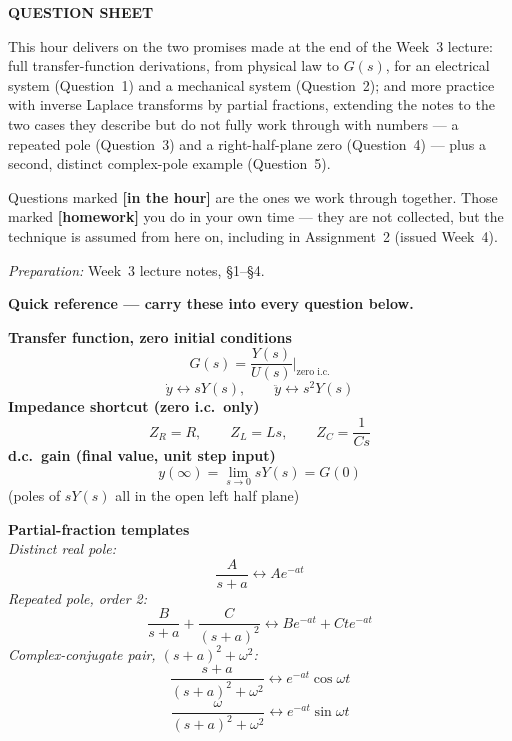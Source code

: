\documentclass[11pt,a4paper]{article}
\newif\ifsolutions
\begin{document}
\weektitle

\begin{center}
\ifsolutions
  {\large\sffamily\bfseries\color{fflag}QUESTIONS AND SOLUTIONS}\\[2pt]
  {\small\itshape Instructor copy --- do not circulate before the tutorial.}
\else
  {\large\sffamily\bfseries\color{fnavy}QUESTION SHEET}
\fi
\end{center}

\bigskip
\noindent
This hour delivers on the two promises made at the end of the Week~3 lecture:
full transfer-function derivations, from physical law to $G(s)$, for an
electrical system (Question~1) and a mechanical system (Question~2); and more
practice with inverse Laplace transforms by partial fractions, extending the
notes to the two cases they describe but do not fully work through with
numbers --- a repeated pole (Question~3) and a right-half-plane zero
(Question~4) --- plus a second, distinct complex-pole example
(Question~5).

\smallskip
\noindent
Questions marked \textbf{\color{faccent}[in the hour]} are the ones we work
through together. Those marked \textbf{\color{fflag}[homework]} you do in your
own time --- they are not collected, but the technique is assumed from here
on, including in Assignment~2 (issued Week~4).

\smallskip
\noindent
\emph{Preparation:} Week~3 lecture notes, \S1--\S4.

\begin{readingbox}
\textbf{Quick reference --- carry these into every question below.}

\smallskip
\begin{minipage}[t]{0.48\textwidth}
\textbf{Transfer function, zero initial conditions}\\[2pt]
\footnotesize
\[
  G(s) = \frac{Y(s)}{U(s)}\bigg|_{\text{zero i.c.}}
\]
\[
  \dot y \leftrightarrow sY(s),\qquad
  \ddot y \leftrightarrow s^2Y(s)
\]
\textbf{Impedance shortcut (zero i.c.\ only)}
\[
  Z_R=R,\qquad Z_L=Ls,\qquad Z_C=\frac{1}{Cs}
\]
\textbf{d.c.\ gain (final value, unit step input)}
\[
  y(\infty)=\lim_{s\to0}sY(s)=G(0)
\]
(poles of $sY(s)$ all in the open left half plane)
\end{minipage}
\hfill
\begin{minipage}[t]{0.48\textwidth}
\textbf{Partial-fraction templates}\\[2pt]
\footnotesize
\emph{Distinct real pole:}
\[
  \frac{A}{s+a} \leftrightarrow Ae^{-at}
\]
\emph{Repeated pole, order 2:}
\[
  \frac{B}{s+a}+\frac{C}{(s+a)^2}
  \leftrightarrow
  Be^{-at}+Cte^{-at}
\]
\emph{Complex-conjugate pair, $(s+a)^2+\omega^2$:}
\[
  \frac{s+a}{(s+a)^2+\omega^2}\leftrightarrow e^{-at}\cos\omega t
\]
\[
  \frac{\omega}{(s+a)^2+\omega^2}\leftrightarrow e^{-at}\sin\omega t
\]
\end{minipage}
\end{readingbox}
\end{document}
